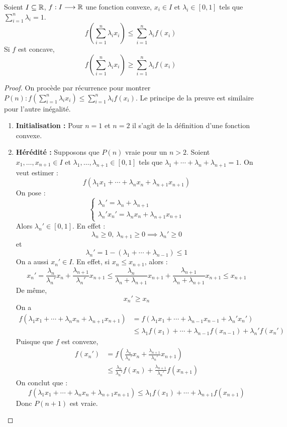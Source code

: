 \begin{theorem}
	Soient $I \subseteq \mathbb{R}$, $f : I \longrightarrow \mathbb{R}$ une fonction convexe, $x_i \in I$ et $\lambda_i \in [0, 1]$ tels que $\sum_{i=1}^n \lambda_i = 1$.
	\[ f \left( \sum_{i=1}^{n} \lambda_i x_i \right) \leq \sum_{i=1}^{n} \lambda_i f(x_i) \]
	Si $f$ est concave, 
	\[ f \left( \sum_{i=1}^{n} \lambda_i x_i \right) \geq \sum_{i=1}^{n} \lambda_i f(x_i) \]
\end{theorem}

\begin{proof}\cite{inegalite_jensen_bibmath}
	On procède par récurrence pour montrer $P(n) : f \left( \sum_{i=1}^{n} \lambda_i x_i \right) \leq \sum_{i=1}^{n} \lambda_i f(x_i)$. Le principe de la preuve est similaire pour l'autre inégalité.
	\begin{enumerate}
		\item \textbf{Initialisation :} Pour $n = 1$ et $n = 2$ il s'agit de la définition d'une fonction convexe.
		\item \textbf{Hérédité :} Supposons que $P(n)$ vraie pour un $n > 2$. Soient $x_1, \ldots, x_{n+1} \in I$ et $\lambda_1, \ldots, \lambda_{n+1} \in [0,1]$ tels que $\lambda_1 + \cdots + \lambda_n + \lambda_{n+1} = 1$. On veut estimer :
		\[ f(\lambda_1 x_1 + \cdots + \lambda_n x_n + \lambda_{n+1} x_{n+1} ) \]
		On pose :
		\[ 
		\begin{cases}
			\lambda_n' = \lambda_n + \lambda_{n+1} \\
			\lambda_n' x_n' = \lambda_n x_n + \lambda_{n+1} x_{n+1}
		\end{cases}
		\]
		Alors $\lambda_n' \in [0, 1]$. En effet :
		\[ \lambda_n \geq 0,\ \lambda_{n+1} \geq 0 \implies \lambda_n' \geq 0 \]
		et 
		\[ \lambda_n' = 1 - (\lambda_1+ \cdots + \lambda_{n-1}) \leq 1 \]
		On a aussi $x_n' \in I$. En effet, si $x_n \leq x_{n+1}$, alors :
		\[ x_n' = \frac{\lambda_n}{\lambda_n'} x_n + \frac{\lambda_{n+1}}{\lambda_n'} x_{n+1} \leq \frac{\lambda_n}{\lambda_n + \lambda_{n+1}} x_{n+1} + \frac{\lambda_{n+1}}{\lambda_n + \lambda_{n+1}} x_{n+1} \leq x_{n+1} \]
		De même, 
		\[ x_n' \geq x_n \]
		On a 
		\begin{align*}
			f(\lambda_1 x_1 + \cdots + \lambda_n x_n + \lambda_{n+1} x_{n+1}) &= f(\lambda_1 x_1 + \cdots + \lambda_{n-1} x_{n-1} + \lambda_n' x_n') \\
			&\leq \lambda_1 f(x_1) + \cdots  + \lambda_{n-1} f(x_{n-1}) + \lambda_n' f(x_n') 
		\end{align*}
		Puisque que $f$ est convexe,
		\begin{align*}
			f(x_n') &= f \left(\frac{\lambda_n}{\lambda_n'} x_n + \frac{\lambda_{n+1}}{\lambda_n'} x_{n+1}\right) \\
			&\leq \frac{\lambda_n}{\lambda_n'} f(x_n) + \frac{\lambda_{n+1}}{\lambda_n'} f(x_{n+1})
		\end{align*}
		On conclut que :
		\[ f(\lambda_1 x_1 + \cdots + \lambda_n x_n + \lambda_{n+1} x_{n+1}) \leq \lambda_1f(x_1) + \cdots  +\lambda_{n+1} f(x_{n+1}) \]
		Donc $P(n+1)$ est vraie.
	\end{enumerate}
\end{proof}

